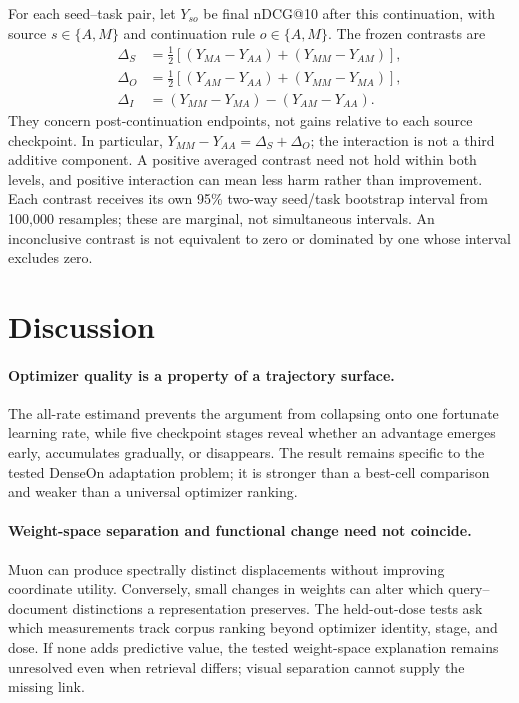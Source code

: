 \documentclass[11pt]{article}
\begin{document}
For each seed--task pair, let $Y_{so}$ be final nDCG@10 after this continuation, with source
$s\in\{A,M\}$ and continuation rule $o\in\{A,M\}$. The frozen contrasts are
\begin{align}
\Delta_S &= \tfrac12[(Y_{MA}-Y_{AA})+(Y_{MM}-Y_{AM})],\\
\Delta_O &= \tfrac12[(Y_{AM}-Y_{AA})+(Y_{MM}-Y_{MA})],\\
\Delta_I &= (Y_{MM}-Y_{MA})-(Y_{AM}-Y_{AA}).
\end{align}
They concern post-continuation endpoints, not gains relative to each source checkpoint. In
particular, $Y_{MM}-Y_{AA}=\Delta_S+\Delta_O$; the interaction is not a third additive component.
A positive averaged contrast need not hold within both levels, and positive interaction can mean
less harm rather than improvement. Each contrast receives its own 95\% two-way seed/task bootstrap
interval from 100,000 resamples; these are marginal, not simultaneous intervals. An inconclusive
contrast is not equivalent to zero or dominated by one whose interval excludes zero.

\StateOperatorMechanismFinding

\section{Discussion}

\paragraph{Optimizer quality is a property of a trajectory surface.}
The all-rate estimand prevents the argument from collapsing onto one fortunate learning rate, while
five checkpoint stages reveal whether an advantage emerges early, accumulates gradually, or
disappears. The result remains specific to the tested DenseOn adaptation problem; it is stronger
than a best-cell comparison and weaker than a universal optimizer ranking.

\paragraph{Weight-space separation and functional change need not coincide.}
Muon can produce spectrally distinct displacements without improving coordinate utility. Conversely,
small changes in weights can alter which query--document distinctions a representation preserves.
The held-out-dose tests ask which measurements track corpus ranking beyond optimizer identity,
stage, and dose. If none adds predictive value, the tested weight-space explanation remains
unresolved even when retrieval differs; visual separation cannot supply the missing link.
\end{document}
